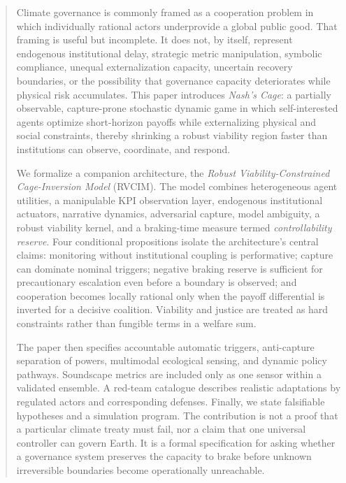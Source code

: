 \documentclass[11pt,a4paper]{article}
\numberwithin{equation}{section}
\theoremstyle{definition}
\theoremstyle{plain}
\theoremstyle{remark}
\newcommand{\RVCIM}{\textsc{RVCIM}}
\begin{document}
\begin{abstract}
Climate governance is commonly framed as a cooperation problem in which individually rational actors underprovide a global public good. That framing is useful but incomplete. It does not, by itself, represent endogenous institutional delay, strategic metric manipulation, symbolic compliance, unequal externalization capacity, uncertain recovery boundaries, or the possibility that governance capacity deteriorates while physical risk accumulates. This paper introduces \emph{Nash's Cage}: a partially observable, capture-prone stochastic dynamic game in which self-interested agents optimize short-horizon payoffs while externalizing physical and social constraints, thereby shrinking a robust viability region faster than institutions can observe, coordinate, and respond.

We formalize a companion architecture, the \emph{Robust Viability-Constrained Cage-Inversion Model} (\RVCIM). The model combines heterogeneous agent utilities, a manipulable KPI observation layer, endogenous institutional actuators, narrative dynamics, adversarial capture, model ambiguity, a robust viability kernel, and a braking-time measure termed \emph{controllability reserve}. Four conditional propositions isolate the architecture's central claims: monitoring without institutional coupling is performative; capture can dominate nominal triggers; negative braking reserve is sufficient for precautionary escalation even before a boundary is observed; and cooperation becomes locally rational only when the payoff differential is inverted for a decisive coalition. Viability and justice are treated as hard constraints rather than fungible terms in a welfare sum.

The paper then specifies accountable automatic triggers, anti-capture separation of powers, multimodal ecological sensing, and dynamic policy pathways. Soundscape metrics are included only as one sensor within a validated ensemble. A red-team catalogue describes realistic adaptations by regulated actors and corresponding defenses. Finally, we state falsifiable hypotheses and a simulation program. The contribution is not a proof that a particular climate treaty must fail, nor a claim that one universal controller can govern Earth. It is a formal specification for asking whether a governance system preserves the capacity to brake before unknown irreversible boundaries become operationally unreachable.
\end{abstract}
\end{document}
